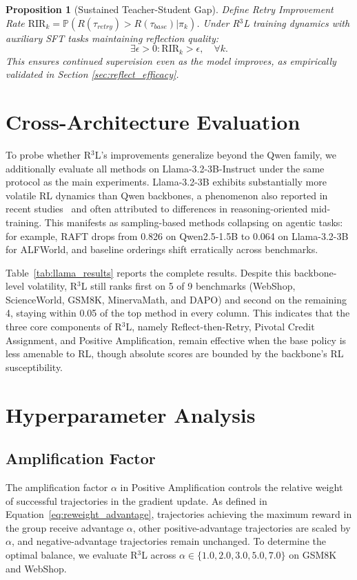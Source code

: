 \documentclass{article} %
\newtheorem{proposition}[theorem]{Proposition}
\theoremstyle{definition}
\theoremstyle{remark}
\let\cite\citep
\begin{document}
\begin{proposition}[Sustained Teacher-Student Gap]
\label{prop:gap}
Define Retry Improvement Rate $\text{RIR}_k = \mathbb{P}(R(\tau_{retry}) > R(\tau_{base}) | \pi_k)$. Under R$^3$L training dynamics with auxiliary SFT tasks maintaining reflection quality:
\begin{equation}
\exists \epsilon > 0 : \text{RIR}_k > \epsilon, \quad \forall k.
\end{equation}
This ensures continued supervision even as the model improves, as empirically validated in Section \ref{sec:reflect_efficacy}.
\end{proposition}


\section{Cross-Architecture Evaluation}
\label{sec:cross_arch}

To probe whether R$^3$L's improvements generalize beyond the Qwen family, we additionally evaluate all methods on Llama-3.2-3B-Instruct under the same protocol as the main experiments. Llama-3.2-3B exhibits substantially more volatile RL dynamics than Qwen backbones, a phenomenon also reported in recent studies~\cite{zhang2025interplay} and often attributed to differences in reasoning-oriented mid-training. This manifests as sampling-based methods collapsing on agentic tasks: for example, RAFT drops from 0.826 on Qwen2.5-1.5B to 0.064 on Llama-3.2-3B for ALFWorld, and baseline orderings shift erratically across benchmarks.



Table~\ref{tab:llama_results} reports the complete results. Despite this backbone-level volatility, R$^3$L still ranks first on 5 of 9 benchmarks (WebShop, ScienceWorld, GSM8K, MinervaMath, and DAPO) and second on the remaining 4, staying within 0.05 of the top method in every column. This indicates that the three core components of R$^3$L, namely Reflect-then-Retry, Pivotal Credit Assignment, and Positive Amplification, remain effective when the base policy is less amenable to RL, though absolute scores are bounded by the backbone's RL susceptibility.

\section{Hyperparameter Analysis}
\label{sec:hyperparam}

\subsection{Amplification Factor}
The amplification factor $\alpha$ in Positive Amplification controls the relative weight of successful trajectories in the gradient update. As defined in Equation~\ref{eq:reweight_advantage}, trajectories achieving the maximum reward in the group receive advantage $\alpha$, other positive-advantage trajectories are scaled by $\alpha$, and negative-advantage trajectories remain unchanged. To determine the optimal balance, we evaluate R$^3$L across $\alpha \in \{1.0, 2.0, 3.0, 5.0, 7.0\}$ on GSM8K and WebShop.
\end{document}
